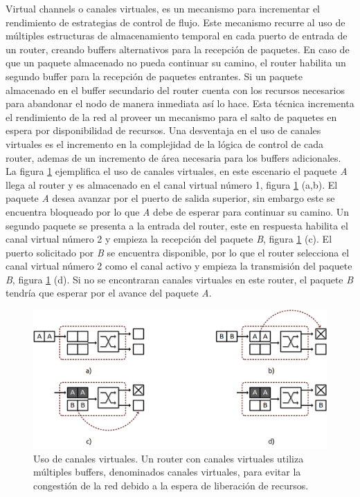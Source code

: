 Virtual channels o canales virtuales\cite{chapter1:6663237, chapter1:Mello:2005:VCN:1081081.1081128}, es un mecanismo para incrementar el rendimiento de estrategias de control de flujo.  Este mecanismo recurre al uso de múltiples estructuras de almacenamiento temporal en cada puerto de entrada de un router, creando buffers alternativos para la recepción de paquetes. En caso de que un paquete almacenado no pueda continuar su camino, el router habilita un segundo buffer para la recepción de paquetes entrantes. Si un paquete almacenado en el buffer secundario del router cuenta con los recursos necesarios para abandonar el nodo de manera inmediata así lo hace. Esta técnica incrementa el rendimiento de la red al proveer un mecanismo para el salto de paquetes en espera por disponibilidad de recursos. Una desventaja en el uso de canales virtuales es el incremento en la complejidad de la lógica de control de cada router, ademas de un incremento de área necesaria para los buffers adicionales. La figura \ref{fig:ch1_vc} ejemplifica el uso de canales virtuales, en este escenario el paquete \textit{A} llega al router y es almacenado en el canal virtual número 1, figura \ref{fig:ch1_vc} (a,b). El paquete \textit{A} desea avanzar por el puerto de salida superior, sin embargo este se encuentra bloqueado por lo que \textit{A} debe de esperar para continuar su camino. Un segundo paquete se presenta a la entrada del router, este en respuesta habilita el canal virtual número 2 y empieza la recepción del paquete \textit{B}, figura \ref{fig:ch1_vc} (c). El puerto solicitado por \textit{B} se encuentra disponible, por lo que el router selecciona el canal virtual número 2 como el canal activo y empieza la transmisión del paquete \textit{B}, figura \ref{fig:ch1_vc} (d). Si no se encontraran canales virtuales en este router, el paquete \textit{B} tendría que esperar por el avance del paquete \textit{A}.   


\begin{figure}
	\includegraphics[width=\linewidth]{figures/ch1_vc.png}
	\caption
		{	
			Uso de canales virtuales. Un router con canales virtuales utiliza múltiples buffers, denominados canales virtuales, para evitar la congestión de la red debido a la espera de liberación de recursos.
		}
	\label{fig:ch1_vc}
\end{figure}

